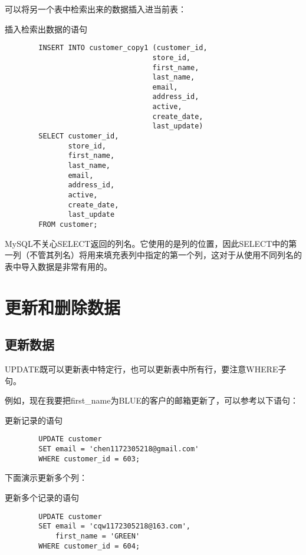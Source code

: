 \documentclass[UTF8]{article}
\begin{document}
可以将另一个表中检索出来的数据插入进当前表：

\begin{listing}[H]
        \caption{插入检索出数据的语句}
	\label{code:insertselectrowclause}
\begin{verbatim}
        INSERT INTO customer_copy1 (customer_id,
                                   store_id,
                                   first_name,
                                   last_name,
                                   email,
                                   address_id,
                                   active,
                                   create_date,
                                   last_update)
        SELECT customer_id,
               store_id,
               first_name,
               last_name,
               email,
               address_id,
               active,
               create_date,
               last_update
        FROM customer;
\end{verbatim}
\end{listing}

\begin{orangebox}[frametitle={Tips 19.3.1 INSERT SELECT中的列名在插入中的作用}]
        MySQL不关心SELECT返回的列名。它使用的是列的位置，因此SELECT中的第一列（不管其列名）将用来填充表列中指定的第一个列，这对于从使用不同列名的表中导入数据是非常有用的。
\end{orangebox} 

\section{更新和删除数据}
\subsection{更新数据}

UPDATE既可以更新表中特定行，也可以更新表中所有行，要注意WHERE子句。

例如，现在我要把first\_name为BLUE的客户的邮箱更新了，可以参考以下语句：

\begin{listing}[H]
        \caption{更新记录的语句}
	\label{code:updaterowclause}
\begin{verbatim}
        UPDATE customer
        SET email = 'chen1172305218@gmail.com'
        WHERE customer_id = 603;
\end{verbatim}
\end{listing}

下面演示更新多个列：
\begin{listing}[H]
        \caption{更新多个记录的语句}
	\label{code:updatemultirowclause}
\begin{verbatim}
        UPDATE customer
        SET email = 'cqw1172305218@163.com',
            first_name = 'GREEN'
        WHERE customer_id = 604;
\end{verbatim}
\end{listing}
\end{document}
